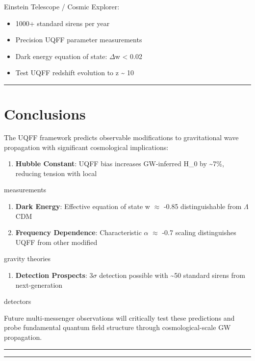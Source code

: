 \documentclass[12pt,a4paper]{article}
\begin{document}
Einstein Telescope / Cosmic Explorer:

\begin{itemize}
  \item 1000+ standard sirens per year
  \item Precision UQFF parameter measurements
  \item Dark energy equation of state: $\Delta$w < 0.02
  \item Test UQFF redshift evolution to z \textasciitilde{} 10
\end{itemize}

\medskip\hrule\medskip

\section{Conclusions}

The UQFF framework predicts observable modifications to gravitational wave propagation with significant cosmological implications:

\begin{enumerate}
  \item \textbf{Hubble Constant}: UQFF bias increases GW-inferred H\_0 by \textasciitilde{}7\%, reducing tension with local
\end{enumerate}

measurements

\begin{enumerate}
  \item \textbf{Dark Energy}: Effective equation of state w $\approx$ -0.85 distinguishable from $\Lambda$CDM
  \item \textbf{Frequency Dependence}: Characteristic $\alpha$ $\approx$ -0.7 scaling distinguishes UQFF from other modified
\end{enumerate}

gravity theories

\begin{enumerate}
  \item \textbf{Detection Prospects}: 3$\sigma$ detection possible with \textasciitilde{}50 standard sirens from next-generation
\end{enumerate}

detectors

Future multi-messenger observations will critically test these predictions and probe fundamental quantum field structure through cosmological-scale GW propagation.

\medskip\hrule\medskip

\medskip\hrule\medskip
\end{document}
